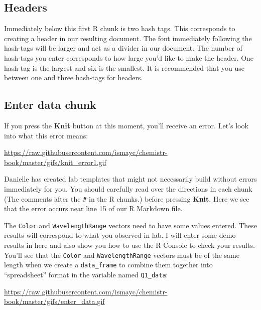 \documentclass[]{tufte-book}
\begin{document}
\subsection{Headers}\label{headers}

Immediately below this first R chunk is two hash tags. This corresponds
to creating a header in our resulting document. The font immediately
following the hash-tags will be larger and act as a divider in our
document. The number of hash-tags you enter corresponds to how large
you'd like to make the header. One hash-tag is the largest and six is
the smallest. It is recommended that you use between one and three
hash-tags for headers.

\subsection{Enter data chunk}\label{enter-data-chunk}

If you press the \textbf{Knit} button at this moment, you'll receive an
error. Let's look into what this error means:

\vspace{0.1in}

\begin{center}\footnotesize{\url{https://raw.githubusercontent.com/ismayc/chemistr-book/master/gifs/knit_error1.gif}}\end{center}

\vspace{0.1in}

Danielle has created lab templates that might not necessarily build
without errors immediately for you. You should carefully read over the
directions in each chunk (The comments after the \texttt{\#} in the R
chunks.) before pressing \textbf{Knit}. Here we see that the error
occurs near line 15 of our R Markdown file.

The \texttt{Color} and \texttt{WavelengthRange} vectors need to have
some values entered. These results will correspond to what you observed
in lab. I will enter some demo results in here and also show you how to
use the R Console to check your results. You'll see that the
\texttt{Color} and \texttt{WavelengthRange} vectors must be of the same
length when we create a \texttt{data\_frame} to combine them together
into ``spreadsheet'' format in the variable named \texttt{Q1\_data}:

\vspace{0.1in}

\begin{center}\footnotesize{\url{https://raw.githubusercontent.com/ismayc/chemistr-book/master/gifs/enter_data.gif}}\end{center}
\end{document}
